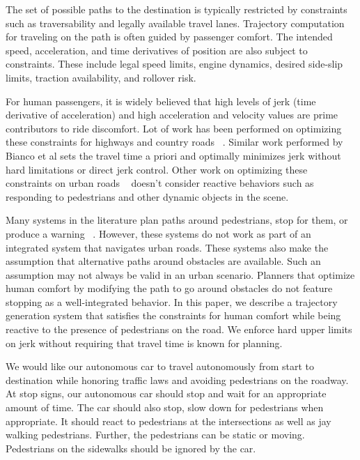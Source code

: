 \documentclass[letterpaper, 10 pt, conference]{ieeeconf}  %
\begin{document}
The set of possible paths to the destination is typically restricted
by constraints such as traversability and legally available travel lanes.
Trajectory computation for traveling on the path is often guided by passenger comfort. 
The intended speed, acceleration, and time derivatives of position are also subject to constraints.
These include legal speed limits, engine dynamics, desired side-slip limits, traction availability, and rollover risk.

For human passengers, it is widely believed that high levels of jerk (time derivative of acceleration) and high acceleration and velocity values are prime contributors to ride discomfort.
Lot of work has been performed on optimizing these constraints for highways and country roads ~\cite{ziegler14,bahram15,xu12,CHEB15CI}.
Similar work performed by Bianco et al \cite{GuarinoLoBianco2004,GuarinoLoBianco2005,Bianco2007,Bianco2009,GuarinoLoBianco2013} sets the travel time a priori and optimally minimizes jerk without hard limitations or direct jerk control.
Other work on optimizing these constraints on urban roads ~\cite{Rastelli14,Li15} doesn't consider reactive behaviors such as responding to pedestrians and other dynamic objects in the scene.

Many systems in the literature plan paths around pedestrians, stop for them, or produce a warning ~\cite{pradalier05,benenson06,gu14,mogelmose15,johnson13}. However, these systems do not work as part of an integrated system that navigates urban roads.
These systems also make the assumption that alternative paths around obstacles are available. Such an assumption may not always be valid in an urban scenario.
Planners that optimize human comfort by modifying the path to go around obstacles \cite{Villagra2012,Villagra2012a} do not feature stopping as a well-integrated behavior.
In this paper, we describe a trajectory generation system that satisfies the constraints for human comfort while being reactive to the presence of pedestrians on the road. We enforce hard upper limits on jerk without requiring that travel time is known for planning.

We would like our autonomous car to travel autonomously from start to destination while honoring traffic laws and avoiding pedestrians on the roadway.
At stop signs, our autonomous car should stop and wait for an appropriate amount of time.
The car should also stop, slow down for pedestrians when appropriate.
It should react to pedestrians at the intersections as well as jay walking pedestrians.
Further, the pedestrians can be static or moving.
Pedestrians on the sidewalks should be ignored by the car.
\end{document}
